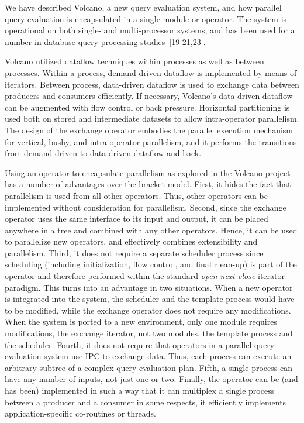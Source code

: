 \documentclass[a4paper,11pt,notitlepage,twoside,openright]{article}
\begin{document}
We have described Volcano, a new query evaluation
system, and how parallel query evaluation is encapsulated in
a single module or operator. The system is operational on
both single- and multi-processor systems, and has been used
for a number in database query processing studies~{[19-21,23]}.

Volcano utilized dataflow techniques within processes
as well as between processes. Within a process, demand-driven
dataflow is implemented by means of iterators.
Between process, data-driven dataflow is used to exchange
data between producers and consumers efficiently. If necessary,
Volcano's data-driven dataflow can be augmented with
flow control or back pressure. Horizontal partitioning is
used both on stored and intermediate datasets to allow
intra-operator parallelism. The design of the exchange
operator embodies the parallel execution mechanism for
vertical, bushy, and intra-operator parallelism, and it performs
the transitions from demand-driven to data-driven
dataflow and back.

Using an operator to encapsulate parallelism as
explored in the Volcano project has a number of advantages
over the bracket model. First, it hides the fact that parallelism
is used from all other operators. Thus, other operators
can be implemented without consideration for parallelism.
Second, since the exchange operator uses the same
interface to its input and output, it can be placed anywhere
in a tree and combined with any other operators. Hence, it
can be used to parallelize new operators, and effectively
combines extensibility and parallelism. Third, it does not
require a separate scheduler process since scheduling
(including initialization, flow control, and final clean-up) is
part of the operator and therefore performed within the standard
\emph{open-next-close} iterator paradigm. This turns into an
advantage in two situations. When a new operator is
integrated into the system, the scheduler and the template
process would have to be modified, while the exchange
operator does not require any modifications. When the system
is ported to a new environment, only one module
requires modifications, the exchange iterator, not two
modules, the template process and the scheduler. Fourth, it
does not require that operators in a parallel query evaluation
system use IPC to exchange data. Thus, each process can
execute an arbitrary subtree of a complex query evaluation
plan. Fifth, a single process can have any number of
inputs, not just one or two. Finally, the operator can be
(and has been) implemented in such a way that it can multiplex
a single process between a producer and a consumer
in some respects, it efficiently implements application-specific
co-routines or threads.
\end{document}
